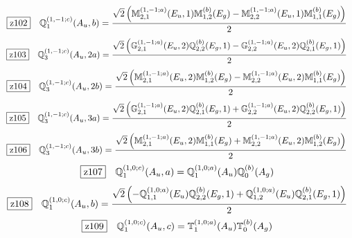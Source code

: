 \documentclass[fleqn,10pt,landscape]{jsarticle}
\begin{document}
\begin{dmath*}
\hspace*{3mm}\fbox{z102}\quad \mathbb{Q}_{1}^{(1,-1;c)}(A_{u},b)=\frac{\sqrt{2} \left(\mathbb{M}_{2,1}^{(1,-1;a)}(E_{u},1) \mathbb{M}_{1,2}^{(b)}(E_{g}) - \mathbb{M}_{2,2}^{(1,-1;a)}(E_{u},1) \mathbb{M}_{1,1}^{(b)}(E_{g})\right)}{2}
\end{dmath*}
\begin{dmath*}
\hspace*{3mm}\fbox{z103}\quad \mathbb{Q}_{3}^{(1,-1;c)}(A_{u},2a)=\frac{\sqrt{2} \left(\mathbb{G}_{2,1}^{(1,-1;a)}(E_{u},2) \mathbb{Q}_{2,2}^{(b)}(E_{g},1) - \mathbb{G}_{2,2}^{(1,-1;a)}(E_{u},2) \mathbb{Q}_{2,1}^{(b)}(E_{g},1)\right)}{2}
\end{dmath*}
\begin{dmath*}
\hspace*{3mm}\fbox{z104}\quad \mathbb{Q}_{3}^{(1,-1;c)}(A_{u},2b)=\frac{\sqrt{2} \left(\mathbb{M}_{2,1}^{(1,-1;a)}(E_{u},2) \mathbb{M}_{1,2}^{(b)}(E_{g}) - \mathbb{M}_{2,2}^{(1,-1;a)}(E_{u},2) \mathbb{M}_{1,1}^{(b)}(E_{g})\right)}{2}
\end{dmath*}
\begin{dmath*}
\hspace*{3mm}\fbox{z105}\quad \mathbb{Q}_{3}^{(1,-1;c)}(A_{u},3a)=\frac{\sqrt{2} \left(\mathbb{G}_{2,1}^{(1,-1;a)}(E_{u},2) \mathbb{Q}_{2,1}^{(b)}(E_{g},1) + \mathbb{G}_{2,2}^{(1,-1;a)}(E_{u},2) \mathbb{Q}_{2,2}^{(b)}(E_{g},1)\right)}{2}
\end{dmath*}
\begin{dmath*}
\hspace*{3mm}\fbox{z106}\quad \mathbb{Q}_{3}^{(1,-1;c)}(A_{u},3b)=\frac{\sqrt{2} \left(\mathbb{M}_{2,1}^{(1,-1;a)}(E_{u},2) \mathbb{M}_{1,1}^{(b)}(E_{g}) + \mathbb{M}_{2,2}^{(1,-1;a)}(E_{u},2) \mathbb{M}_{1,2}^{(b)}(E_{g})\right)}{2}
\end{dmath*}
\begin{dmath*}
\hspace*{3mm}\fbox{z107}\quad \mathbb{Q}_{1}^{(1,0;c)}(A_{u},a)=\mathbb{Q}_{1}^{(1,0;a)}(A_{u}) \mathbb{Q}_{0}^{(b)}(A_{g})
\end{dmath*}
\begin{dmath*}
\hspace*{3mm}\fbox{z108}\quad \mathbb{Q}_{1}^{(1,0;c)}(A_{u},b)=\frac{\sqrt{2} \left(- \mathbb{Q}_{1,1}^{(1,0;a)}(E_{u}) \mathbb{Q}_{2,2}^{(b)}(E_{g},1) + \mathbb{Q}_{1,2}^{(1,0;a)}(E_{u}) \mathbb{Q}_{2,1}^{(b)}(E_{g},1)\right)}{2}
\end{dmath*}
\begin{dmath*}
\hspace*{3mm}\fbox{z109}\quad \mathbb{Q}_{1}^{(1,0;c)}(A_{u},c)=\mathbb{T}_{1}^{(1,0;a)}(A_{u}) \mathbb{T}_{0}^{(b)}(A_{g})
\end{dmath*}
\end{document}

